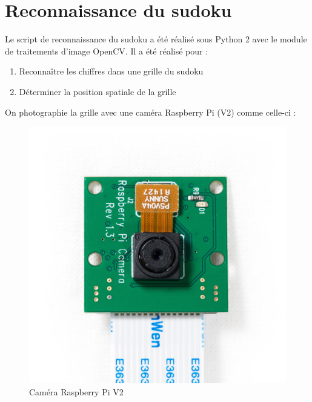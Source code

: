 \documentclass[12pt,a4paper]{report}
\begin{document}
\section{Reconnaissance du sudoku}
	Le script de reconnaissance du sudoku a été réalisé sous Python 2 avec le module de traitements d'image OpenCV. Il a été réalisé pour :
	\begin{enumerate}
	\item Reconnaître les chiffres dans une grille du sudoku
	\item Déterminer la position spatiale de la grille
	\end{enumerate}
	\newpage
	On photographie la grille avec une caméra Raspberry Pi (V2) comme celle-ci :
	\begin{figure}[!h]
 \center
 \includegraphics[scale=0.2]{../pictures/camera.jpg}
 \caption{Caméra Raspberry Pi V2}
\end{figure}
\end{document}
